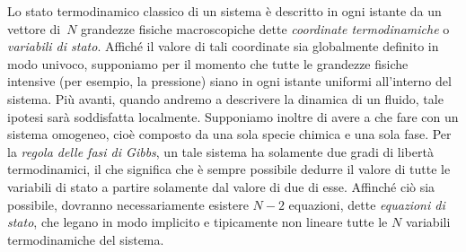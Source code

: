 Lo stato termodinamico classico di un sistema 
è descritto in ogni istante da un vettore di~$N$
grandezze fisiche macroscopiche %
dette \emph{coordinate termodinamiche} o \emph{variabili di stato}.
Affiché il valore di tali coordinate sia globalmente definito in modo
univoco, supponiamo per il momento che tutte le grandezze fisiche
intensive (per esempio, la pressione) siano in ogni istante uniformi
all'interno del sistema.
Più avanti, quando andremo a descrivere la dinamica di un fluido,
tale ipotesi sarà soddisfatta localmente.
Supponiamo inoltre di avere a che fare con un sistema omogeneo,
cioè composto da una sola specie chimica e una sola fase.
Per la \emph{regola delle fasi di Gibbs}, un tale sistema ha solamente
due gradi di libertà termodinamici, il che significa che è sempre possibile
dedurre il valore di tutte le variabili di stato a partire solamente
dal valore di due di esse.
Affinché ciò sia possibile, dovranno necessariamente esistere $N-2$
equazioni, dette \emph{equazioni di stato}, che legano in modo
implicito e tipicamente non lineare tutte le $N$ variabili termodinamiche del sistema.

